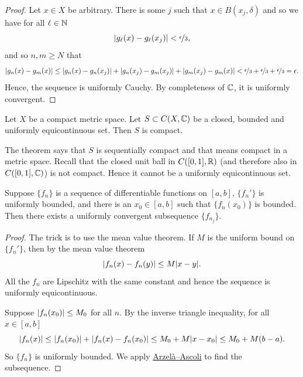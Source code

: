 \begin{proof}
Let $x \in X$ be arbitrary.  There is some $j$ such that
$x \in B(x_j,\delta)$ and so we have for all $\ell \in {\mathbb{N}}$
\begin{equation*}
\lvert {g_\ell(x)-g_\ell(x_j)} \rvert < \nicefrac{\epsilon}{3},
\end{equation*}
and so $n,m \geq N$ that
\begin{equation*}
\lvert {g_n(x)-g_m(x)} \rvert \leq
\lvert {g_n(x)-g_n(x_j)} \rvert +
\lvert {g_n(x_j)-g_m(x_j)} \rvert +
\lvert {g_m(x_j)-g_m(x)} \rvert <
\nicefrac{\epsilon}{3} +
\nicefrac{\epsilon}{3} +
\nicefrac{\epsilon}{3} = \epsilon .
\end{equation*}
Hence, the sequence is uniformly Cauchy.  By completeness of ${\mathbb{C}}$,
it is uniformly convergent.
\end{proof}

\begin{cor}
Let $X$ be a compact metric space.
Let $S \subset C(X,{\mathbb{C}})$ be a closed, bounded and uniformly equicontinuous set.
Then $S$ is compact.
\end{cor}

The theorem says that $S$
is sequentially compact and that means
compact in a metric space.
Recall that the closed unit ball in $C([0,1],{\mathbb{R}})$ (and therefore also in
$C([0,1],{\mathbb{C}})$) is not compact.
Hence it cannot be a uniformly equicontinuous set.

\begin{cor}
Suppose $\{ f_n \}$ is a sequence of differentiable functions on $[a,b]$,
$\{ f_n' \}$ is uniformly bounded, and there is an
$x_0 \in [a,b]$ such that $\{ f_n(x_0) \}$ is bounded.
Then there exists a uniformly convergent
subsequence $\{ f_{n_j} \}$.
\end{cor}

\begin{proof}
The trick is to use the mean value theorem.  If $M$ is the uniform bound on
$\{ f_n' \}$, then by the mean value theorem
\begin{equation*}
\lvert {f_n(x)-f_n(y)} \rvert \leq M \lvert {x-y} \rvert .
\end{equation*}
All the $f_n$ are Lipschitz with the same constant and hence
the sequence is
uniformly equicontinuous.

Suppose $\lvert {f_n(x_0)} \rvert \leq M_0$ for all $n$.
By the inverse triangle inequality, for all $x \in [a,b]$
\begin{equation*}
\lvert {f_n(x)} \rvert \leq \lvert {f_n(x_0)} \rvert+ \lvert {f_n(x)-f_n(x_0)} \rvert \leq M_0+ M \lvert {x-x_0} \rvert
\leq M_0 + M(b-a) .
\end{equation*}
So $\{ f_n \}$ is uniformly bounded.
We apply \hyperref[thm:arzelaascoli]{Arzel\`a--Ascoli} to find the subsequence.
\end{proof}

